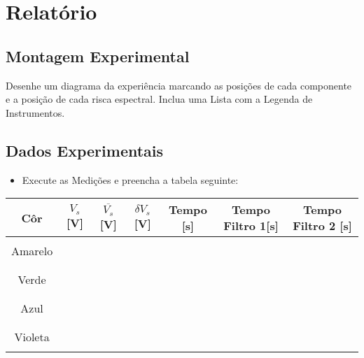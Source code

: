 \documentclass[a4paper,12pt]{article}  %
\begin{document}
\section{\sf Relatório}
\subsection{\sf Montagem Experimental}
Desenhe um diagrama da experiência marcando as posições de cada componente e a posição de cada risca espectral. Inclua uma Lista com a  Legenda de Instrumentos.

\begin{center}
\framebox[18cm]{\rule{0pt}{6.5cm}}
\end{center}

\newpage


\subsection{\sf Dados Experimentais}

\begin{itemize}
\item Execute as Medições e preencha a tabela seguinte:
\end{itemize}

\begin{center}
	\begin{tabular}{|c|c|c|c|c|c|c|}
	\hline
	Côr  & $V_s$ [V] & $\overline{V_s}$ [V]	& $\delta V_s$ [V] & Tempo [s] & Tempo Filtro 1[s] & Tempo Filtro 2 [s]\\
	\hline
	 &  &  &  &  &  & \\ \cline{2-2}
	Amarelo &  & & &  & &  \\ \cline{2-2}
	 &  &  &  &  &  & \\ 
	\hline
	 &  &  &  &  &  & \\ \cline{2-2}
	Verde & & & &  & &\\ \cline{2-2}
	 &  &  &  &  &  & \\ 
	\hline
	 &  &  &  &  &  & \\ \cline{2-2}
	Azul & & & &  & &\\ \cline{2-2}
	 &  &  &  &  &  & \\ 
	\hline
	 &  &  &  &  &  & \\ \cline{2-2}
	Violeta & & & &  & & \\ \cline{2-2}
	 &  &  &  &  &  & \\ 
	\hline
 	\end{tabular}
\end{center}
\end{document}
